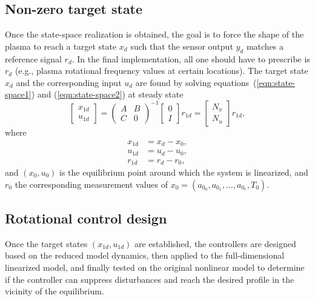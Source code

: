 \documentclass[12pt]{iopart}
\begin{document}
\subsection{Non-zero target state}
Once the state-space realization is obtained, the goal is to force the shape of the plasma to reach a target state $x_d$ such that the sensor output $y_d$ matches a reference signal $r_d$. In the final implementation, all one should have to prescribe is $r_d$ (e.g., plasma rotational frequency values at certain locations). The target state $x_d$ and the corresponding input $u_d$ are found by solving equations~(\ref{eqn:state-space1}) and (\ref{eqn:state-space2}) at steady state
\begin{equation}
\left[\! \begin{array}{c}  x_{1d} \\ u_{1d}\end{array}\!\right]
  ={ \left(\! \begin{array}{cc} A  & B \\ C & 0 \end{array} \! \right)}^{-1} \left[\! \begin{array}{c} 0 \\ I    \end{array}  \!\right] r_{1d} = \left[\! \begin{array}{c} N_x \\ N_u    \end{array}  \!\right] r_{1d},
\label{steadystate}
\end{equation}
where 
\begin{eqnarray}
 x_{1d}  &= x_d - x_0, \\
 u_{1d}  &= u_d - u_0, \\
 r_{1d}  &= r_d - r_0 ,
\end{eqnarray}
and $\left( x_0, u_0  \right)$ is the equilibrium point around which the system is linearized, and $r_0$ the corresponding measurement values of $x_0 = \left( a_{0_0},a_{0_1}, ... , a_{0_r} ,  T_0 \right)$. 
 
\subsection{Rotational control design} 
Once the target states $\left( x_{1d} , u_{1d} \right)$ are established, the controllers are designed based on the reduced model dynamics, then applied to the full-dimensional linearized model, and finally tested on the original nonlinear model to determine if the controller can suppress disturbances and reach the desired profile in the vicinity of the equilibrium.
\end{document}
